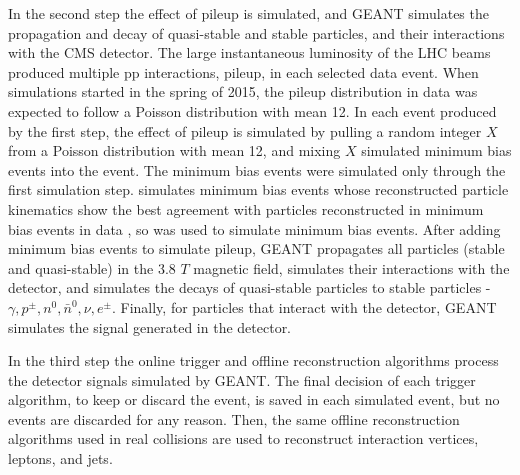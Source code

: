 
In the second step the effect of pileup is simulated, and GEANT \cite{geant4} simulates the propagation and decay of 
quasi-stable and stable particles, and their interactions with the CMS detector.  The large instantaneous luminosity of the LHC 
beams produced multiple pp interactions, pileup, in each selected data event.  When \MC simulations started in the spring of 2015, 
the pileup distribution in data was expected to follow a Poisson distribution with mean 12.  In each event produced 
by the first step, the effect of pileup is simulated by pulling a 
random integer $X$ from a Poisson distribution with mean 12, and mixing $X$ simulated minimum bias events into the event.  The 
minimum bias events were simulated only through the first simulation step.  \PYTHIA simulates minimum bias events whose reconstructed 
particle kinematics show the best agreement with particles reconstructed in minimum bias events in data \cite{pythiaForHadronization}, 
so \PYTHIA was used to simulate minimum bias events.  After adding minimum bias events to simulate pileup, GEANT propagates all particles 
(stable and quasi-stable) in the 3.8 $\unit{T}$ magnetic field, simulates their interactions with the detector, and simulates the decays 
of quasi-stable particles to stable particles - $\gamma,p^{\pm},n^{0},\bar{n}^{0},\nu,e^{\pm}$.  Finally, for particles that interact 
with the detector, GEANT simulates the signal generated in the detector.

In the third step the online trigger and offline reconstruction algorithms process the detector signals simulated by GEANT.  The 
final decision of each trigger algorithm, to keep or discard the event, is saved in each simulated event, but no events are discarded 
for any reason.  Then, the same offline reconstruction algorithms used in real collisions are used to reconstruct interaction vertices, 
leptons, and jets.

